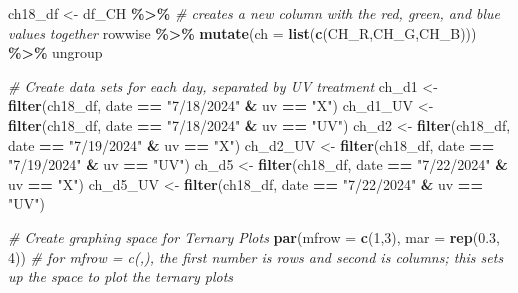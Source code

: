 \documentclass[
]{article}
\newenvironment{Shaded}{\begin{snugshade}}{\end{snugshade}}
\newcommand{\AttributeTok}[1]{\textcolor[rgb]{0.13,0.29,0.53}{#1}}
\newcommand{\CommentTok}[1]{\textcolor[rgb]{0.56,0.35,0.01}{\textit{#1}}}
\newcommand{\DecValTok}[1]{\textcolor[rgb]{0.00,0.00,0.81}{#1}}
\newcommand{\FloatTok}[1]{\textcolor[rgb]{0.00,0.00,0.81}{#1}}
\newcommand{\FunctionTok}[1]{\textcolor[rgb]{0.13,0.29,0.53}{\textbf{#1}}}
\newcommand{\NormalTok}[1]{#1}
\newcommand{\OtherTok}[1]{\textcolor[rgb]{0.56,0.35,0.01}{#1}}
\newcommand{\SpecialCharTok}[1]{\textcolor[rgb]{0.81,0.36,0.00}{\textbf{#1}}}
\newcommand{\StringTok}[1]{\textcolor[rgb]{0.31,0.60,0.02}{#1}}
\begin{document}
\begin{Shaded}
\begin{Highlighting}[]
\NormalTok{ch18\_df }\OtherTok{\textless{}{-}}\NormalTok{ df\_CH }\SpecialCharTok{\%\textgreater{}\%} \CommentTok{\# creates a new column with the red, green, and blue values together}
\NormalTok{  rowwise }\SpecialCharTok{\%\textgreater{}\%}
  \FunctionTok{mutate}\NormalTok{(}\AttributeTok{ch =} \FunctionTok{list}\NormalTok{(}\FunctionTok{c}\NormalTok{(CH\_R,CH\_G,CH\_B))) }\SpecialCharTok{\%\textgreater{}\%}
\NormalTok{  ungroup}

\CommentTok{\# Create data sets for each day, separated by UV treatment}
\NormalTok{ch\_d1 }\OtherTok{\textless{}{-}} \FunctionTok{filter}\NormalTok{(ch18\_df, date }\SpecialCharTok{==} \StringTok{"7/18/2024"} \SpecialCharTok{\&}\NormalTok{ uv }\SpecialCharTok{==} \StringTok{"X"}\NormalTok{)}
\NormalTok{ch\_d1\_UV }\OtherTok{\textless{}{-}} \FunctionTok{filter}\NormalTok{(ch18\_df, date }\SpecialCharTok{==} \StringTok{"7/18/2024"} \SpecialCharTok{\&}\NormalTok{ uv }\SpecialCharTok{==} \StringTok{"UV"}\NormalTok{)}
\NormalTok{ch\_d2 }\OtherTok{\textless{}{-}} \FunctionTok{filter}\NormalTok{(ch18\_df, date }\SpecialCharTok{==} \StringTok{"7/19/2024"} \SpecialCharTok{\&}\NormalTok{ uv }\SpecialCharTok{==} \StringTok{"X"}\NormalTok{)}
\NormalTok{ch\_d2\_UV }\OtherTok{\textless{}{-}} \FunctionTok{filter}\NormalTok{(ch18\_df, date }\SpecialCharTok{==} \StringTok{"7/19/2024"} \SpecialCharTok{\&}\NormalTok{ uv }\SpecialCharTok{==} \StringTok{"UV"}\NormalTok{)}
\NormalTok{ch\_d5 }\OtherTok{\textless{}{-}} \FunctionTok{filter}\NormalTok{(ch18\_df, date }\SpecialCharTok{==} \StringTok{"7/22/2024"} \SpecialCharTok{\&}\NormalTok{ uv }\SpecialCharTok{==} \StringTok{"X"}\NormalTok{)}
\NormalTok{ch\_d5\_UV }\OtherTok{\textless{}{-}} \FunctionTok{filter}\NormalTok{(ch18\_df, date }\SpecialCharTok{==} \StringTok{"7/22/2024"} \SpecialCharTok{\&}\NormalTok{ uv }\SpecialCharTok{==} \StringTok{"UV"}\NormalTok{)}

\CommentTok{\# Create graphing space for Ternary Plots}
\FunctionTok{par}\NormalTok{(}\AttributeTok{mfrow =} \FunctionTok{c}\NormalTok{(}\DecValTok{1}\NormalTok{,}\DecValTok{3}\NormalTok{), }\AttributeTok{mar =} \FunctionTok{rep}\NormalTok{(}\FloatTok{0.3}\NormalTok{, }\DecValTok{4}\NormalTok{)) }\CommentTok{\# for mfrow = c(,), the first number is rows and second is columns; this sets up the space to plot the ternary plots}


\end{Highlighting}
\end{Shaded}
\end{document}
